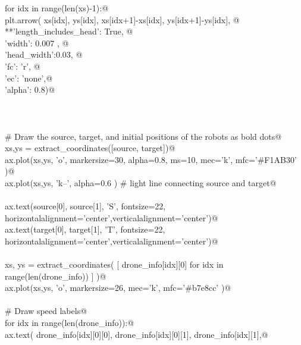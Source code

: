 \documentclass[12.0pt]{report}
\begin{document}
\begin{flushleft}
\begin{minipage}{\linewidth}
\begin{list}{}{}
\mbox{}\verb@    for idx in range(len(xs)-1):@\\
\mbox{}\verb@          plt.arrow( xs[idx], ys[idx], xs[idx+1]-xs[idx], ys[idx+1]-ys[idx], @\\
\mbox{}\verb@                    **{'length_includes_head': True, @\\
\mbox{}\verb@                       'width': 0.007 , @\\
\mbox{}\verb@                       'head_width':0.03, @\\
\mbox{}\verb@                       'fc': 'r', @\\
\mbox{}\verb@                       'ec': 'none',@\\
\mbox{}\verb@                       'alpha': 0.8})@\\
\mbox{}\verb@@\\
\mbox{}\verb@@\\
\mbox{}\verb@@\\
\mbox{}\verb@    # Draw the source, target, and initial positions of the robots as bold dots@\\
\mbox{}\verb@    xs,ys = extract_coordinates([source, target])@\\
\mbox{}\verb@    ax.plot(xs,ys, 'o', markersize=30, alpha=0.8, ms=10, mec='k', mfc='#F1AB30' )@\\
\mbox{}\verb@    ax.plot(xs,ys, 'k--', alpha=0.6 ) # light line connecting source and target@\\
\mbox{}\verb@@\\
\mbox{}\verb@    ax.text(source[0], source[1], 'S', fontsize=22,\@\\
\mbox{}\verb@            horizontalalignment='center',verticalalignment='center')@\\
\mbox{}\verb@    ax.text(target[0], target[1], 'T', fontsize=22,\@\\
\mbox{}\verb@            horizontalalignment='center',verticalalignment='center')@\\
\mbox{}\verb@@\\
\mbox{}\verb@    xs, ys = extract_coordinates( [ drone_info[idx][0] for idx in range(len(drone_info)) ]  )@\\
\mbox{}\verb@    ax.plot(xs,ys, 'o', markersize=26, mec='k', mfc='#b7e8cc' )@\\
\mbox{}\verb@@\\
\mbox{}\verb@    # Draw speed labels@\\
\mbox{}\verb@    for idx in range(len(drone_info)):@\\
\mbox{}\verb@         ax.text( drone_info[idx][0][0], drone_info[idx][0][1], drone_info[idx][1],@\\

\end{list}
\end{minipage}
\end{flushleft}
\end{document}
